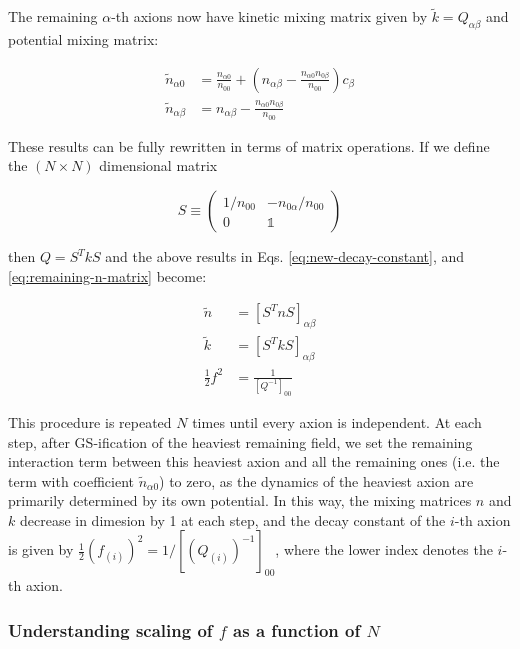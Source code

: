 \documentclass{article}
\begin{document}
The remaining $\alpha$-th axions now have kinetic mixing matrix given by $\tilde{k}= Q_{\alpha\beta}$ and potential mixing matrix:

\begin{align}
    \label{eq:remaining-n-matrix}
    \tilde{n}_{\alpha 0} & = \frac{n_{\alpha 0}}{n_{00}} + (n_{\alpha\beta}-\frac{n_{\alpha 0}n_{0 \beta}}{n_{00}})c_\beta\\
    \tilde{n}_{\alpha\beta} & = n_{\alpha\beta} - \frac{n_{\alpha 0}n_{0 \beta}}{n_{00}}
\end{align}

These results can be fully rewritten in terms of matrix operations. If we define the $(N\times N)$ dimensional matrix

\begin{equation}
    S \equiv \begin{pmatrix}
        1/n_{00} & -n_{0\alpha}/n_{00} \\
        0 & \mathbb{1}
    \end{pmatrix}
\end{equation}

\noindent then $Q = S^TkS$ and the above results in Eqs. \eqref{eq:new-decay-constant}, and \eqref{eq:remaining-n-matrix} become:

\begin{align}
    \tilde{n} & = [S^TnS]_{\alpha\beta} \\
    \tilde{k} & = [S^TkS]_{\alpha\beta} \\
    \frac{1}{2}f^2 & = \frac{1}{[Q^{-1}]_{00}} \label{eq:f-matrix-version}
\end{align}

This procedure is repeated $N$ times until every axion is independent. At each step, after GS-ification of the heaviest remaining field, we set the remaining interaction term between this heaviest axion and all the remaining ones (i.e. the term with coefficient $\tilde{n}_{\alpha 0}$) to zero, as the dynamics of the heaviest axion are primarily determined by its own potential. In this way, the mixing matrices $n$ and $k$ decrease in dimesion by 1 at each step, and the decay constant of the $i$-th axion is given by $\frac{1}{2}(f_{(i)})^2 = 1/[(Q_{(i)})^{-1}]_{00}$, where the lower index denotes the $i$-th axion.

\subsubsection{Understanding scaling of $f$ as a function of $N$}
\end{document}
